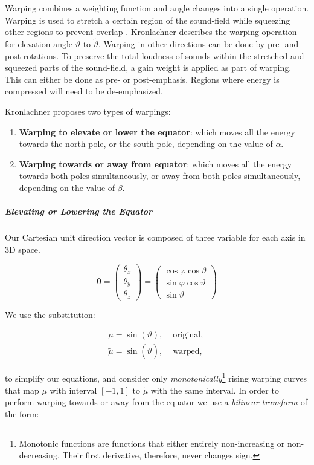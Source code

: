 Warping combines a weighting function and angle changes into a single operation. Warping is used to stretch a certain region of the sound-field while squeezing other regions to prevent overlap \cite{kronlachner2014spatial}. Kronlachner describes the warping operation for elevation angle $\vartheta$ to $\tilde{\vartheta}$. Warping in other directions can be done by pre- and post-rotations. To preserve the total loudness of sounds within the stretched and squeezed parts of the sound-field, a gain weight is applied as part of warping. This can either be done as pre- or post-emphasis. Regions where energy is compressed will need to be de-emphasized. 

Kronlachner proposes two types of warpings:

\begin{enumerate}
    \item \textbf{Warping to elevate or lower the equator}: which moves all the energy towards the north pole, or the south pole, depending on the value of $\alpha$.
    \item \textbf{Warping towards or away from equator}: which moves all the energy towards both poles simultaneously, or away from both poles simultaneously, depending on the value of $\beta$.
\end{enumerate}

\subparagraph{Elevating or Lowering the Equator}

Our Cartesian unit direction vector is composed of three variable for each axis in 3D space.

$$
\boldsymbol{\theta}=\left(\begin{array}{l}
\theta_{x} \\
\theta_{y} \\
\theta_{z}
\end{array}\right)=\left(\begin{array}{c}
\cos \varphi \cos \vartheta \\
\sin \varphi \cos \vartheta \\
\sin \vartheta
\end{array}\right)
$$

We use the substitution:

$$
\begin{array}{ll}
\mu=\sin (\vartheta), & \text { original, } \\
\tilde{\mu}=\sin (\tilde{\vartheta}), & \text { warped, }
\end{array}
$$

to simplify our equations, and consider only \textit{monotonically}\footnote{Monotonic functions are functions that either entirely non-increasing or non-decreasing. Their first derivative, therefore, never changes sign.} rising warping curves that map $\mu$ with interval $[-1, 1]$ to $\tilde{\mu}$ with the same interval. In order to perform warping towards or away from the equator we use a \textit{bilinear transform} of the form:

